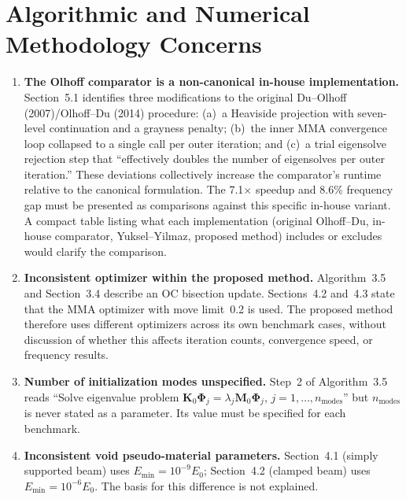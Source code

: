\documentclass[11pt,a4paper]{article}
\begin{document}
\section{Algorithmic and Numerical Methodology Concerns}

\begin{enumerate}[leftmargin=*, label=\textbf{A\arabic*.}]

\item \textbf{The Olhoff comparator is a non-canonical in-house implementation.}
Section~5.1 identifies three modifications to the original Du--Olhoff
(2007)/Olhoff--Du (2014) procedure: (a)~a Heaviside projection with
seven-level continuation and a grayness penalty; (b)~the inner MMA
convergence loop collapsed to a single call per outer iteration; and
(c)~a trial eigensolve rejection step that ``effectively doubles the
number of eigensolves per outer iteration.'' These deviations
collectively increase the comparator's runtime relative to the
canonical formulation. The 7.1$\times$ speedup and 8.6\% frequency gap
must be presented as comparisons against this specific in-house variant.
A compact table listing what each implementation (original Olhoff--Du,
in-house comparator, Yuksel--Yilmaz, proposed method) includes or
excludes would clarify the comparison.

\item \textbf{Inconsistent optimizer within the proposed method.}
Algorithm~3.5 and Section~3.4 describe an OC bisection update.
Sections~4.2 and~4.3 state that the MMA optimizer with move limit~0.2
is used. The proposed method therefore uses different optimizers across
its own benchmark cases, without discussion of whether this affects
iteration counts, convergence speed, or frequency results.

\item \textbf{Number of initialization modes unspecified.}
Step~2 of Algorithm~3.5 reads ``Solve eigenvalue problem
$\mathbf{K}_0\boldsymbol{\Phi}_j = \lambda_j\mathbf{M}_0\boldsymbol{\Phi}_j$,
$j=1,\ldots,n_\mathrm{modes}$'' but $n_\mathrm{modes}$ is never stated
as a parameter. Its value must be specified for each benchmark.

\item \textbf{Inconsistent void pseudo-material parameters.}
Section~4.1 (simply supported beam) uses $E_\mathrm{min}=10^{-9}E_0$;
Section~4.2 (clamped beam) uses $E_\mathrm{min}=10^{-6}E_0$. The
basis for this difference is not explained.

\end{enumerate}
\end{document}
